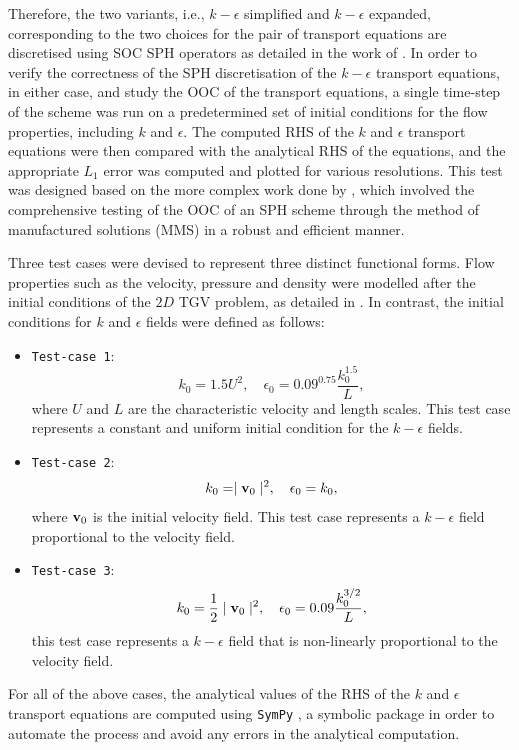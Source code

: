Therefore, the two variants, i.e., $k-\epsilon$ simplified and $k-\epsilon$ expanded, corresponding to the two choices for the pair of transport equations are discretised using SOC SPH operators as detailed in the work of \cite{Negi2022Techniques}.
In order to verify the correctness of the SPH discretisation of the $k-\epsilon$ transport equations, in either case, and study the OOC of the transport equations, a single time-step of the scheme was run on a predetermined set of initial conditions for the flow properties, including $k$ and $\epsilon$. The computed RHS of the $k$ and $\epsilon$ transport equations were then compared with the analytical RHS of the equations, and the appropriate $L_1$ error was computed and plotted for various resolutions. This test was designed based on the more complex work done by \cite{Negi_Ramachandran_2021}, which involved the comprehensive testing of the OOC of an SPH scheme through the method of manufactured solutions (MMS) in a robust and efficient manner.

Three test cases were devised to represent three distinct functional forms. Flow properties such as the velocity, pressure and density were modelled after the initial conditions of the $2D$ TGV problem, as detailed in . In contrast, the initial conditions for $k$ and $\epsilon$ fields were defined as follows:
\begin{itemize}
  \item \texttt{Test-case 1}:
  \begin{equation}
    k_0 = 1.5 U^2, \quad \epsilon_0 = 0.09^{0.75} \frac{k_0^{1.5}}{L},
  \end{equation}
  where $U$ and $L$ are the characteristic velocity and length scales. This test case represents a constant and uniform initial condition for the $k-\epsilon$ fields.

  \item \texttt{Test-case 2}:
  \begin{equation}
    k_0 = \mid \mathbf{v}_0 \mid^2, \quad \epsilon_0 = k_0,
  \end{equation}
  where $\mathbf{v}_0$ is the initial velocity field. This test case represents a $k-\epsilon$ field proportional to the velocity field.

  \item \texttt{Test-case 3}:
  \begin{equation}
    k_0 = \frac{1}{2}\mid \mathbf{v}_0 \mid^2, \quad \epsilon_0 = 0.09 \frac{k_0^{3/2}}{L},
  \end{equation}
  this test case represents a $k-\epsilon$ field that is non-linearly proportional to the velocity field.
\end{itemize}
For all of the above cases, the analytical values of the RHS of the $k$ and $\epsilon$ transport equations are computed using \texttt{SymPy} \parencite{Meurer2017}, a symbolic package in order to automate the process and avoid any errors in the analytical computation.

